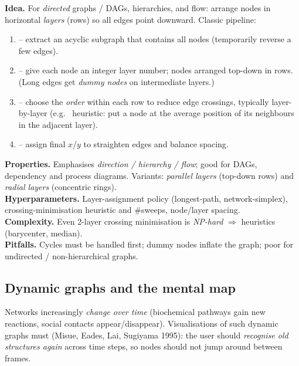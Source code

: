 \begin{algobox}
\textbf{Idea.} For \emph{directed} graphs / DAGs, hierarchies, and flow: arrange
nodes in horizontal \emph{layers} (rows) so all edges point downward. Classic
pipeline:
\begin{enumerate}[leftmargin=1.5em]
  \item {} -- extract an acyclic subgraph that contains all
  nodes (temporarily reverse a few edges).
  \item {} -- give each node an integer layer number; nodes
  arranged top-down in rows. (Long edges get \emph{dummy nodes} on intermediate
  layers.)
  \item {} -- choose the \emph{order} within each row to
  reduce edge crossings, typically layer-by-layer (e.g.\ 
  heuristic: put a node at the average position of its neighbours in the adjacent
  layer).
  \item {} -- assign final $x$/$y$ to straighten edges
  and balance spacing.
\end{enumerate}
\textbf{Properties.} Emphasises \emph{direction / hierarchy / flow}; good for
DAGs, dependency and process diagrams. Variants: \emph{parallel layers}
(top-down rows) and \emph{radial layers} (concentric rings). \\[2pt]
\textbf{Hyperparameters.} Layer-assignment policy (longest-path, network-simplex),
crossing-minimisation heuristic and \#sweeps, node/layer spacing. \\[2pt]
\textbf{Complexity.} Even 2-layer crossing minimisation is \emph{NP-hard}
$\Rightarrow$ heuristics (barycenter, median). \\[2pt]
\textbf{Pitfalls.} Cycles must be handled first; dummy nodes inflate the graph;
poor for undirected / non-hierarchical graphs.
\end{algobox}

\subsection{Dynamic graphs and the mental map}

Networks increasingly \emph{change over time} (biochemical pathways gain new
reactions, social contacts appear/disappear). Visualisations of such dynamic
graphs must  (Misue, Eades, Lai, Sugiyama
1995): the user should \emph{recognise old structures again} across time steps,
so nodes should not jump around between frames.

